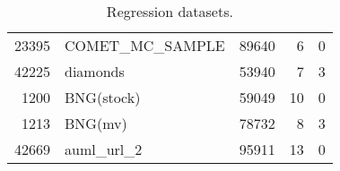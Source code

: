 \begin{table}
\begin{tabular}{rlrrr}
     23395 &     COMET\_MC\_SAMPLE &        89640 &                6 &                0 \\
     42225 &            diamonds &        53940 &                7 &                3 \\
      1200 &          BNG(stock) &        59049 &               10 &                0 \\
      1213 &             BNG(mv) &        78732 &                8 &                3 \\
     42669 &          auml\_url\_2 &        95911 &               13 &                0 \\
\bottomrule
\end{tabular}
\caption{Regression datasets.}
\label{tab:regression_data}
\end{table}
